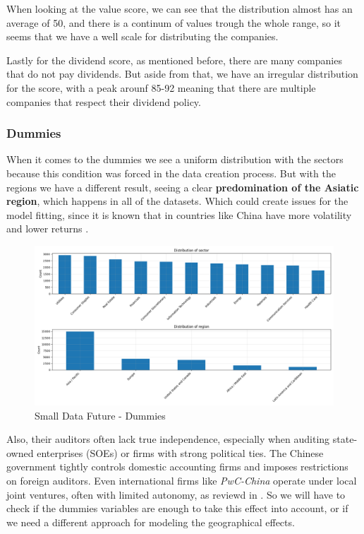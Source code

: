 \documentclass[11pt,english,a4paper,hidelinks]{book}
\begin{document}
\vspace{0.5cm}
\noindent When looking at the value score, we can see that the distribution almost has an average of 50, and there is a continum of values trough the whole range, so it seems that we have a well scale for distributing the companies.

\vspace{0.5cm}
\noindent Lastly for the dividend score, as mentioned before, there are many companies that do not pay dividends. But aside from that, we have an irregular distribution for the score, with a peak arounf 85-92 meaning that there are multiple companies that respect their dividend policy.

\subsubsection{Dummies}

When it comes to the dummies we see a uniform distribution with the sectors because this condition was forced in the data creation process. But with the regions we have a different result, seeing a clear \textbf{predomination of the Asiatic region}, which happens in all of the datasets. Which could create issues for the model fitting, since it is known that in countries like China have more volatility and lower returns \textcite{chen2024economic}.

\begin{figure}[H]
    \centering
    \includegraphics[width=1\linewidth]{images/code/descriptive analysis/distributions/Small Data future - Dummies.png}
    \caption{Small Data Future - Dummies}
    \label{fig:small_future_dummies}
\end{figure}

\noindent  Also, their auditors often lack true independence, especially when auditing state-owned enterprises (SOEs) or firms with strong political ties. The Chinese government tightly controls domestic accounting firms and imposes restrictions on foreign auditors. Even international firms like \textit{PwC-China} operate under local joint ventures, often with limited autonomy, as reviewd in \textcite{LIU2012782}. So we will have to check if the dummies variables are enough to take this effect into account, or if we need a different approach for modeling the geographical effects.
\end{document}
